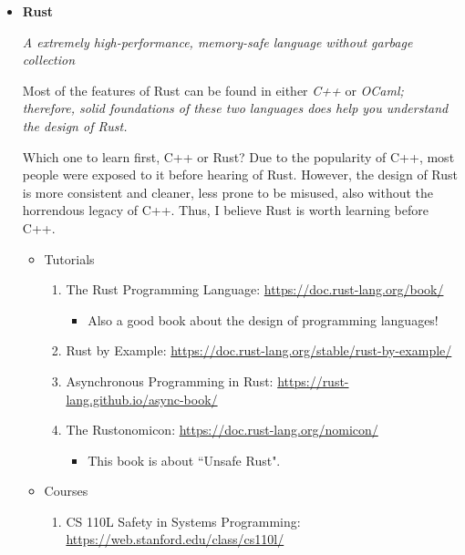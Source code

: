 \documentclass{article}
\begin{document}
\begin{itemize}
    \item \textbf{Rust}
    
    \emph{A extremely high-performance, memory-safe language without garbage collection}
    
    Most of the features of Rust can be found in either \emph{C++} or \em{OCaml}; therefore, solid foundations of these two languages does help you understand the design of Rust.
    
    Which one to learn first, C++ or Rust?
    Due to the popularity of C++, most people were exposed to it before hearing of Rust.
    However, the design of Rust is more consistent and cleaner, less prone to be misused, also without the horrendous legacy of C++.
    Thus, I believe Rust is worth learning before C++.
    
    \begin{itemize}
        \item Tutorials
        \begin{enumerate}
            \item The Rust Programming Language:
            \href{https://doc.rust-lang.org/book/}{https://doc.rust-lang.org/book/}
            \begin{itemize}
                \item Also a good book about the design of programming languages!
            \end{itemize}
            \item Rust by Example:
            \href{https://doc.rust-lang.org/stable/rust-by-example/}{https://doc.rust-lang.org/stable/rust-by-example/}
            \item Asynchronous Programming in Rust:
            \href{https://rust-lang.github.io/async-book/}{https://rust-lang.github.io/async-book/}
            \item The Rustonomicon:
            \href{https://doc.rust-lang.org/nomicon/}{https://doc.rust-lang.org/nomicon/}
            \begin{itemize}
                \item This book is about ``Unsafe Rust".
            \end{itemize}
        \end{enumerate}
        \item Courses
        \begin{enumerate}
            \item CS 110L Safety in Systems Programming:\\
            \href{https://web.stanford.edu/class/cs110l/}{https://web.stanford.edu/class/cs110l/}

\end{enumerate}
\end{itemize}
\end{itemize}
\end{document}
